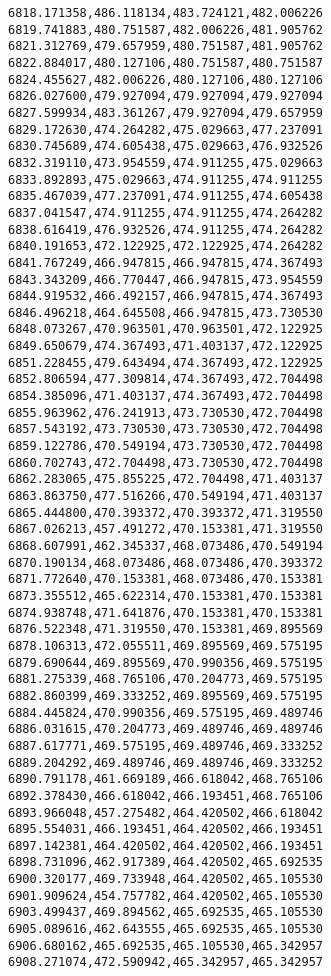 \documentclass[11pt]{article}
\begin{document}
\begin{Verbatim}[commandchars=\\\{\}]
6818.171358,486.118134,483.724121,482.006226
6819.741883,480.751587,482.006226,481.905762
6821.312769,479.657959,480.751587,481.905762
6822.884017,480.127106,480.751587,480.751587
6824.455627,482.006226,480.127106,480.127106
6826.027600,479.927094,479.927094,479.927094
6827.599934,483.361267,479.927094,479.657959
6829.172630,474.264282,475.029663,477.237091
6830.745689,474.605438,475.029663,476.932526
6832.319110,473.954559,474.911255,475.029663
6833.892893,475.029663,474.911255,474.911255
6835.467039,477.237091,474.911255,474.605438
6837.041547,474.911255,474.911255,474.264282
6838.616419,476.932526,474.911255,474.264282
6840.191653,472.122925,472.122925,474.264282
6841.767249,466.947815,466.947815,474.367493
6843.343209,466.770447,466.947815,473.954559
6844.919532,466.492157,466.947815,474.367493
6846.496218,464.645508,466.947815,473.730530
6848.073267,470.963501,470.963501,472.122925
6849.650679,474.367493,471.403137,472.122925
6851.228455,479.643494,474.367493,472.122925
6852.806594,477.309814,474.367493,472.704498
6854.385096,471.403137,474.367493,472.704498
6855.963962,476.241913,473.730530,472.704498
6857.543192,473.730530,473.730530,472.704498
6859.122786,470.549194,473.730530,472.704498
6860.702743,472.704498,473.730530,472.704498
6862.283065,475.855225,472.704498,471.403137
6863.863750,477.516266,470.549194,471.403137
6865.444800,470.393372,470.393372,471.319550
6867.026213,457.491272,470.153381,471.319550
6868.607991,462.345337,468.073486,470.549194
6870.190134,468.073486,468.073486,470.393372
6871.772640,470.153381,468.073486,470.153381
6873.355512,465.622314,470.153381,470.153381
6874.938748,471.641876,470.153381,470.153381
6876.522348,471.319550,470.153381,469.895569
6878.106313,472.055511,469.895569,469.575195
6879.690644,469.895569,470.990356,469.575195
6881.275339,468.765106,470.204773,469.575195
6882.860399,469.333252,469.895569,469.575195
6884.445824,470.990356,469.575195,469.489746
6886.031615,470.204773,469.489746,469.489746
6887.617771,469.575195,469.489746,469.333252
6889.204292,469.489746,469.489746,469.333252
6890.791178,461.669189,466.618042,468.765106
6892.378430,466.618042,466.193451,468.765106
6893.966048,457.275482,464.420502,466.618042
6895.554031,466.193451,464.420502,466.193451
6897.142381,464.420502,464.420502,466.193451
6898.731096,462.917389,464.420502,465.692535
6900.320177,469.733948,464.420502,465.105530
6901.909624,454.757782,464.420502,465.105530
6903.499437,469.894562,465.692535,465.105530
6905.089616,462.643555,465.692535,465.105530
6906.680162,465.692535,465.105530,465.342957
6908.271074,472.590942,465.342957,465.342957

\end{Verbatim}
\end{document}
